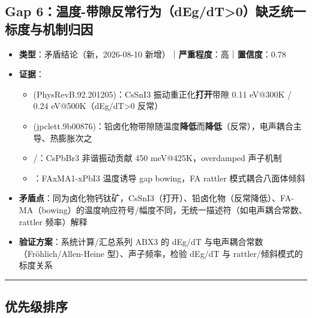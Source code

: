 \documentclass[12pt,a4paper]{ctexart}
\providecommand{\tightlist}{%
  \setlength{\itemsep}{0pt}\setlength{\parskip}{0pt}}
\begin{document}
\subsection{Gap 6：温度-带隙反常行为（dEg/dT\textgreater0）缺乏统一标度与机制归因}\label{gap:gap-6ux6e29ux5ea6-ux5e26ux9699ux53cdux5e38ux884cux4e3adegdt0ux7f3aux4e4fux7edfux4e00ux6807ux5ea6ux4e0eux673aux5236ux5f52ux56e0}

\begin{itemize}
\tightlist
\item
  \textbf{类型}：矛盾结论（新，2026-08-10 新增）｜\textbf{严重程度}：高｜\textbf{置信度}：0.78
\item
  \textbf{证据}：

  \begin{itemize}
  \tightlist
  \item
    \cite{p36} (PhysRevB.92.201205)：CsSnI3 振动重正化\textbf{打开}带隙 0.11 eV@300K / 0.24 eV@500K（dEg/dT\textgreater0 反常）
  \item
    \cite{p39} (jpclett.9b00876)：铅卤化物带隙随温度\textbf{降低}而\textbf{降低}（反常），电声耦合主导、热膨胀次之
  \item
    \cite{p38}/\cite{p37}：CsPbBr3 非谐振动贡献 450 meV@425K，overdamped 声子机制
  \item
    \cite{p49}：FAxMA1-xPbI3 温度诱导 gap bowing，FA rattler 模式耦合八面体倾斜
  \end{itemize}
\item
  \textbf{矛盾点}：同为卤化物钙钛矿，CsSnI3（打开）、铅卤化物（反常降低）、FA-MA（bowing）的温度响应符号/幅度不同，无统一描述符（如电声耦合常数、rattler 频率）解释
\item
  \textbf{验证方案}：系统计算/汇总系列 ABX3 的 dEg/dT 与电声耦合常数（Fröhlich/Allen-Heine 型）、声子频率，检验 dEg/dT 与 rattler/倾斜模式的标度关系
\end{itemize}

\begin{center}\rule{0.5\linewidth}{0.5pt}\end{center}

\subsection{优先级排序}\label{gap:ux4f18ux5148ux7ea7ux6392ux5e8f}
\end{document}

